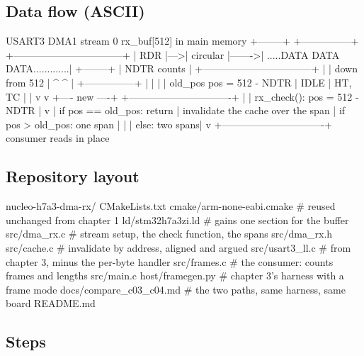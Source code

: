 \subsection*{Data flow (ASCII)}

\begin{asciiart}
  USART3        DMA1 stream 0            rx_buf[512] in main memory
  +--------+    +---------------+        +---------------------------------+
  | RDR    |--->| circular      |------->| .....DATA DATA DATA.............|
  +--------+    | NDTR counts   |        +---------------------------------+
      |         | down from 512 |          ^              ^
      |         +---------------+          |              |
      |                 |               old_pos     pos = 512 - NDTR
      | IDLE            | HT, TC           |              |
      v                 v                  +---- new ----+
  +-------------------------------+                |
  | rx_check(): pos = 512 - NDTR  |                v
  |   if pos == old_pos: return   |   invalidate the cache over the span
  |   if pos >  old_pos: one span |                |
  |   else:              two spans|                v
  +-------------------------------+        consumer reads in place
\end{asciiart}

\subsection*{Repository layout}

\begin{plaincode}
nucleo-h7a3-dma-rx/
  CMakeLists.txt
  cmake/arm-none-eabi.cmake       # reused unchanged from chapter 1
  ld/stm32h7a3zi.ld               # gains one section for the buffer
  src/dma_rx.c                    # stream setup, the check function, the spans
  src/dma_rx.h
  src/cache.c                     # invalidate by address, aligned and argued
  src/usart3_ll.c                 # from chapter 3, minus the per-byte handler
  src/frames.c                    # the consumer: counts frames and lengths
  src/main.c
  host/framegen.py                # chapter 3's harness with a frame mode
  docs/compare_c03_c04.md         # the two paths, same harness, same board
  README.md
\end{plaincode}

\subsection*{Steps}

